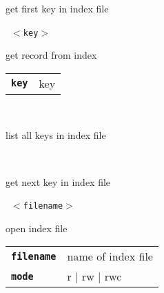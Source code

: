 \begin{description}
\begin{description}
        get first key in index file

       \texttt{ $<$key$>$} \

        get record from index

      \begin{tabular}{ll}
 \texttt{\textbf{key}} &  key  \\
      \end{tabular}
       \texttt{} \

        list all keys in index file

       \texttt{} \

        get next key in index file

       \texttt{ $<$filename$>$ } \

        open index file

      \begin{tabular}{ll}
 \texttt{\textbf{filename}} &  name of index file  \\
 \texttt{\textbf{mode}} &       r | rw | rwc  \\
      \end{tabular}
    \end{description}

\end{description}

